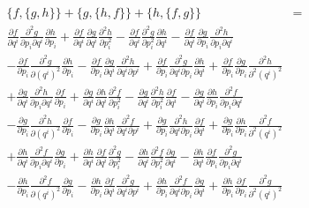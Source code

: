 \documentclass[a4paper,10pt]{article}
\numberwithin{equation}{section}
\begin{document}
\begin{align}
\begin{split}
  \{f,\{g,h\}\} + \{g,\{h,f\}\} + \{h,\{f,g\}\} &= \\
 \frac{\partial f}{\partial q^i}
  \frac{\partial^2 g}{\partial p_i\partial q^i}\frac{\partial h}{\partial p_i} 
  + \frac{\partial f}{\partial q^i}
  \frac{\partial g}{\partial q^i}\frac{\partial^2 h}{\partial p_i^2} 
  -\frac{\partial f}{\partial q^i}
  \frac{\partial^2 g}{\partial p_i^2}\frac{\partial h}{\partial q^i} 
  -\frac{\partial f}{\partial q^i} 
  \frac{\partial g}{\partial p_i}\frac{\partial^2 h}{\partial p_i \partial q^i} \\
  - \frac{\partial f}{\partial p_i}\frac{\partial^2 g}{\partial (q^i)^2}
  \frac{\partial h}{\partial p_i} - \frac{\partial f}{\partial p_i}\frac{\partial g}{\partial q^i}
  \frac{\partial^2 h}{\partial q^i\partial p^i} + \frac{\partial f}{\partial p_i}\frac{\partial^2 g}{\partial q^i\partial p_i}
  \frac{\partial h}{\partial q^i} + \frac{\partial f}{\partial p_i}\frac{\partial g}{\partial p_i}
  \frac{\partial^2 h}{\partial^2(q^i)^2} \\
  + \frac{\partial g}{\partial q^i}
  \frac{\partial^2 h}{\partial p_i\partial q^i}\frac{\partial f}{\partial p_i} 
  + \frac{\partial g}{\partial q^i}
  \frac{\partial h}{\partial q^i}\frac{\partial^2 f}{\partial p_i^2} 
  -\frac{\partial g}{\partial q^i}
  \frac{\partial^2 h}{\partial p_i^2}\frac{\partial f}{\partial q^i} 
  -\frac{\partial g}{\partial q^i} 
  \frac{\partial h}{\partial p_i}\frac{\partial^2 f}{\partial p_i \partial q^i} \\
   - \frac{\partial g}{\partial p_i}\frac{\partial^2 h}{\partial (q^i)^2}
  \frac{\partial f}{\partial p_i} - \frac{\partial g}{\partial p_i}\frac{\partial h}{\partial q^i}
  \frac{\partial^2 f}{\partial q^i\partial p^i} + \frac{\partial g}{\partial p_i}\frac{\partial^2 h}{\partial q^i\partial p_i}
  \frac{\partial f}{\partial q^i} + \frac{\partial g}{\partial p_i}\frac{\partial h}{\partial p_i}
  \frac{\partial^2 f}{\partial^2(q^i)^2} \\
  + \frac{\partial h}{\partial q^i}
  \frac{\partial^2 f}{\partial p_i\partial q^i}\frac{\partial g}{\partial p_i} 
  + \frac{\partial h}{\partial q^i}
  \frac{\partial f}{\partial q^i}\frac{\partial^2 g}{\partial p_i^2} 
  -\frac{\partial h}{\partial q^i}
  \frac{\partial^2 f}{\partial p_i^2}\frac{\partial g}{\partial q^i} 
  -\frac{\partial h}{\partial q^i} 
  \frac{\partial f}{\partial p_i}\frac{\partial^2 g}{\partial p_i \partial q^i} \\
  - \frac{\partial h}{\partial p_i}\frac{\partial^2 f}{\partial (q^i)^2}
  \frac{\partial g}{\partial p_i} - \frac{\partial h}{\partial p_i}\frac{\partial f}{\partial q^i}
  \frac{\partial^2 g}{\partial q^i\partial p^i} + \frac{\partial h}{\partial p_i}\frac{\partial^2 f}{\partial q^i\partial p_i}
  \frac{\partial g}{\partial q^i} + \frac{\partial h}{\partial p_i}\frac{\partial f}{\partial p_i}
  \frac{\partial^2 g}{\partial^2(q^i)^2}
\end{split}
\end{align}
\end{document}
